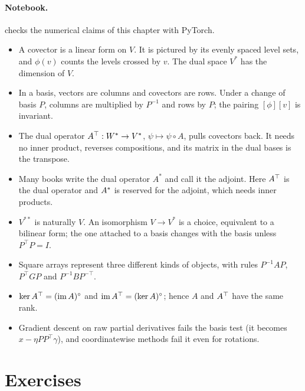 \begin{notechapter}
\paragraph{Notebook.}  checks the numerical
claims of this chapter with PyTorch.

\begin{chaptersummary}
\begin{itemize}[nosep]
  \item A covector is a linear form on $V$. It is pictured by its evenly
        spaced level sets, and $\phi(v)$ counts the levels crossed by $v$.
        The dual space $V^*$ has the dimension of $V$.
  \item In a basis, vectors are columns and covectors are rows. Under a
        change of basis $P$, columns are multiplied by $P^{-1}$ and rows by
        $P$; the pairing $[\phi][v]$ is invariant.
  \item The dual operator $A^{\top}:W^*\to V^*$, $\psi\mapsto\psi\circ A$,
        pulls covectors back. It needs no inner product, reverses
        compositions, and its matrix in the dual bases is the transpose.
  \item Many books write the dual operator $A^*$ and call it the adjoint.
        Here $A^{\top}$ is the dual operator and $A^{*}$ is reserved for
        the adjoint, which needs inner products.
  \item $V^{**}$ is naturally $V$. An isomorphism $V\to V^*$ is a choice,
        equivalent to a bilinear form; the one attached to a basis changes
        with the basis unless $P^\top P = I$.
  \item Square arrays represent three different kinds of objects, with
        rules $P^{-1}AP$, $P^\top GP$ and $P^{-1}BP^{-\top}$.
  \item $\ker A^{\top} = (\operatorname{im} A)^\circ$ and $\operatorname{im}A^{\top} = (\ker A)^\circ$;
        hence $A$ and $A^{\top}$ have the same rank.
  \item Gradient descent on raw partial derivatives fails the basis test
        (it becomes $x - \eta PP^\top\gamma$), and coordinatewise methods
        fail it even for rotations.
\end{itemize}
\end{chaptersummary}

\section*{Exercises}


\end{notechapter}
